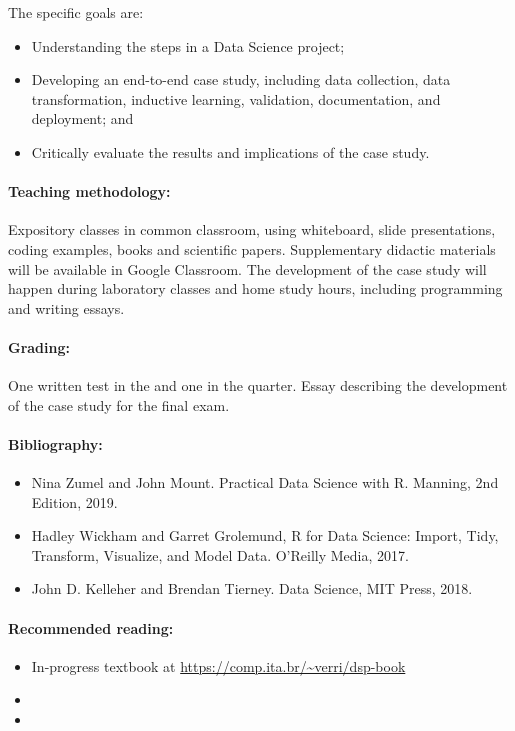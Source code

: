 The specific goals are:
\begin{itemize}
  \item Understanding the steps in a Data Science project;
  \item Developing an end-to-end case study, including data collection, data transformation,
    inductive learning, validation, documentation, and deployment; and
  \item Critically evaluate the results and implications of the case study.
\end{itemize}

\paragraph{Teaching methodology:}
Expository classes in common classroom, using whiteboard, slide presentations, coding
examples, books and scientific papers. Supplementary didactic materials will be available
in Google Classroom. The development of the case study will happen during laboratory
classes and home study hours, including programming and writing essays.

\paragraph{Grading:} One written test in the  and one in the  quarter.
Essay describing the development of the case study for the final exam.

\paragraph{Bibliography:}
\begin{itemize}
  \item Nina Zumel and John Mount. Practical Data Science with R. Manning, 2nd Edition, 2019.
  \item Hadley Wickham and Garret Grolemund, R for Data Science: Import, Tidy, Transform, Visualize, and Model Data. O’Reilly Media, 2017.
  \item John D. Kelleher and Brendan Tierney. Data Science, MIT Press, 2018.
\end{itemize}

\thispagestyle{empty}
\paragraph{Recommended reading:}
\begin{itemize}
  \item In-progress textbook at \url{https://comp.ita.br/~verri/dsp-book}
  \item {}
  \item {}
\end{itemize}

